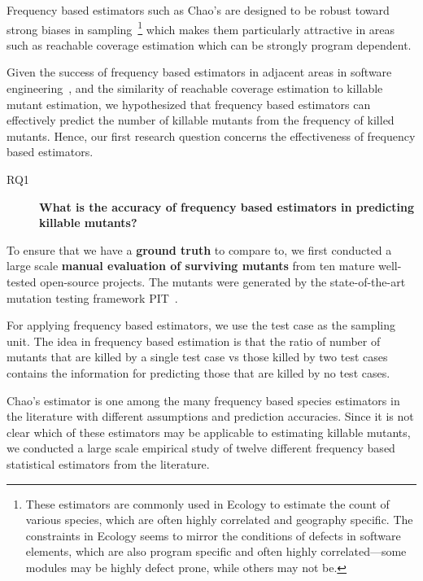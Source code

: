 \documentclass[sigconf,review,anonymous]{acmart}
\newcommand{\estimatorCount}{twelve\xspace}
\newcommand{\projectCount}{ten\xspace}
\newcounter{todocounter}
\newcommand{\todo}[1]{\marginpar{$|$}\textcolor{red}{\stepcounter{todocounter}\footnote[\thetodocounter]{\textcolor{red}{\textbf{TODO }}\textit{#1}}}}
\newcommand{\PIT}{\textsc{PIT}\xspace}
\renewcommand{\todo}[1]{}
\begin{document}
Frequency based estimators such as Chao's are designed to be robust toward
strong biases in sampling~\cite{chao2016species}\footnote{
These estimators are commonly used in Ecology to estimate the count of various
species, which are often highly correlated and geography specific.
The constraints in Ecology seems to mirror the conditions of defects in software
elements, which are also program specific and often highly correlated---some
modules may be highly defect prone, while others may not be.} which makes them
particularly attractive in areas such as reachable coverage estimation
which can be strongly program dependent.

Given the success of frequency based estimators in adjacent areas in software
engineering~\cite{bohme2018assurances,accettura2015the}, and the similarity of
reachable coverage estimation to killable mutant estimation,
we hypothesized that frequency based estimators can effectively
predict the number of killable mutants from the frequency of killed mutants.
Hence, our first research question concerns the effectiveness of frequency based
estimators.

\begin{description}
  \item[RQ1] \textbf{What is the accuracy of frequency based estimators in predicting
    killable mutants?}
\end{description}

To ensure that we have a \textbf{ground truth} to compare to, we first conducted
a large scale \textbf{manual evaluation of surviving mutants} from \projectCount
mature well-tested open-source projects. The mutants were generated by
the state-of-the-art mutation testing framework \PIT~\cite{pit}.

\begin{tcolorbox}[boxrule=0.5pt, arc=4pt, boxsep=0pt, width=\columnwidth]
For applying frequency based estimators, we use the test case as the sampling
unit. The idea in frequency based estimation is that the ratio of number of
mutants that are killed by a single test case vs those killed by two test cases
contains the information for predicting those that are killed by no test cases.
\end{tcolorbox}

Chao's estimator is one among the many frequency based species estimators in
the literature with different assumptions and prediction accuracies.
Since it is not clear which of these estimators
may be applicable to estimating killable mutants, we conducted a large scale
empirical study of \estimatorCount different frequency based statistical estimators from
the literature.
\end{document}
